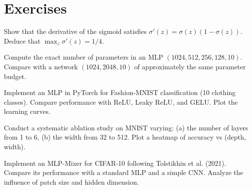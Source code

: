 \section{Exercises}

\begin{exercise}
Show that the derivative of the sigmoid satisfies $\sigma'(z) = \sigma(z)(1 - \sigma(z))$. Deduce that $\max_z \sigma'(z) = 1/4$.
\end{exercise}

\begin{exercise}
Compute the exact number of parameters in an MLP $(1024, 512, 256, 128, 10)$. Compare with a network $(1024, 2048, 10)$ of approximately the same parameter budget.
\end{exercise}

\begin{exercise}
Implement an MLP in PyTorch for Fashion-MNIST classification (10 clothing classes). Compare performance with ReLU, Leaky ReLU, and GELU. Plot the learning curves.
\end{exercise}

\begin{exercise}
Conduct a systematic ablation study on MNIST varying: (a) the number of layers from 1 to 6, (b) the width from 32 to 512. Plot a heatmap of accuracy vs (depth, width).
\end{exercise}

\begin{exercise}
Implement an MLP-Mixer for CIFAR-10 following Tolstikhin et al. (2021). Compare its performance with a standard MLP and a simple CNN. Analyze the influence of patch size and hidden dimension.
\end{exercise}
